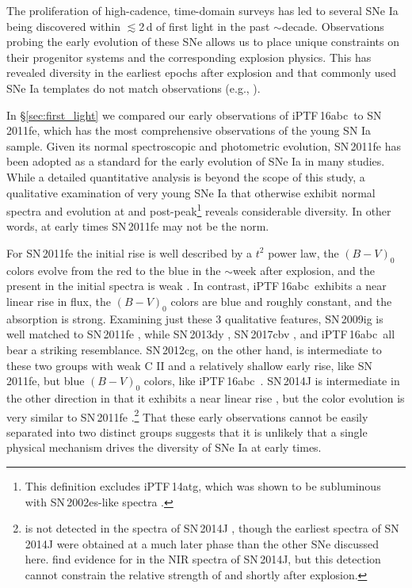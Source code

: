\documentclass[twocolumn]{aastex61}
\newcommand{\abc}{iPTF\,16abc}
\begin{document}
The proliferation of high-cadence, time-domain surveys has led to several SNe Ia being discovered within $\lesssim$2\,d of first light in the past $\sim$decade. Observations probing the early evolution of these SNe allows us to place unique constraints on their progenitor systems and the corresponding explosion physics. This has revealed diversity in the earliest epochs after explosion and that commonly used SNe Ia templates do not match observations (e.g., \citealt{2012ApJ...744...38F}).

In \S\ref{sec:first_light} we compared our early observations of \abc\ to SN\,2011fe, which has the most comprehensive observations of the young SN Ia sample. Given its normal spectroscopic and photometric evolution, SN\,2011fe has been adopted as a standard for the early evolution of SNe Ia in many studies. While a detailed quantitative analysis is beyond the scope of this study, a qualitative examination of very young SNe Ia that otherwise exhibit normal spectra and evolution at and post-peak\footnote{This definition excludes iPTF\,14atg, which was shown to be subluminous with SN\,2002es-like spectra \citep{2015Natur.521..328C}.} reveals considerable diversity. In other words, at early times SN\,2011fe may not be the norm.

For SN\,2011fe the initial rise is well described by a $t^2$ power law, the $(B - V)_0$ colors evolve from the red to the blue in the $\sim$week after explosion, and the  present in the initial spectra is weak \citep{2011Natur.480..344N,2016ApJ...820...67Z,2012ApJ...752L..26P}. In contrast, \abc\ exhibits a near linear rise in flux, the $(B - V)_0$ colors are blue and roughly constant, and the  absorption is strong. Examining just these 3 qualitative features, SN\,2009ig is well matched to SN\,2011fe \citep{2012ApJ...744...38F}, while SN\,2013dy \citep{2013ApJ...778L..15Z}, SN\,2017cbv \citep{2017arXiv170608990H}, and \abc\ all bear a striking resemblance. SN\,2012cg, on the other hand, is intermediate to these two groups with weak C II and a relatively shallow early rise, like SN\,2011fe, but blue $(B - V)_0$ colors, like \abc\ \citep{2012ApJ...756L...7S,2016ApJ...820...92M}. SN\,2014J is intermediate in the other direction in that it exhibits a near linear rise \citep{2014ApJ...783L..24Z,2015ApJ...799..106G}, but the color evolution is very similar to SN\,2011fe \citep{2014ApJ...788L..21A}.\footnote{ is not detected in the spectra of SN\,2014J \citep{2014ApJ...784L..12G,2014ApJ...783L..24Z}, though the earliest spectra of SN\,2014J were obtained at a much later phase than the other SNe discussed here. \citet{2015ApJ...798...39M} find evidence for  in the NIR spectra of SN\,2014J, but this detection cannot constrain the relative strength of  and  shortly after explosion.} That these early observations cannot be easily separated into two distinct groups suggests that it is unlikely that a single physical mechanism drives the diversity of SNe Ia at early times. 
\end{document}
